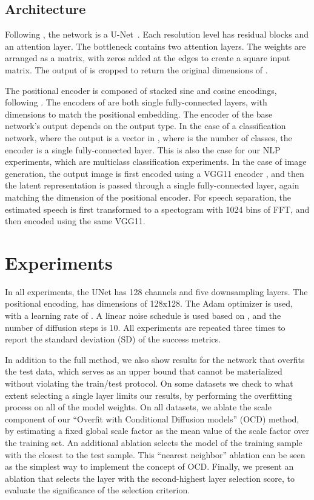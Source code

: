 \documentclass{article}
\theoremstyle{plain}
\begin{document}
\subsection{Architecture}
\label{sec:architecture}
Following  \citet{ho2020denoising}, the network  is a U-Net~\citep{unet}. Each resolution level has residual blocks and an attention layer. The bottleneck contains two attention layers. 
The weights  are arranged as a matrix, with zeros added at the edges to create a square input matrix. The output of  is cropped to return the original dimensions of .

The positional encoder is composed of stacked sine and cosine encodings, following \citet{attention_is_all_u_need}. The encoders of  are both single fully-connected layers, with dimensions to match the positional embedding.  The encoder of the base network's output  depends on the output type. In the case of a classification network, where the output is a vector in , where  is the number of classes, the encoder  is a single fully-connected layer. This is also the case for our NLP experiments, which are multiclass classification experiments. In the case of image generation, the output image is first encoded using a VGG11 encoder \citep{vgg}, and then the latent representation is passed through a single fully-connected layer, again matching the dimension of the positional encoder. For speech separation, the estimated speech is first transformed to a spectogram with 1024 bins of FFT, and then encoded using the same VGG11.

\section{Experiments}

 In all experiments, the UNet  has 128 channels and five downsampling layers. The positional encoding,  has dimensions of 128x128. The Adam optimizer \citep{kingma2014adam} is used, with a learning rate of . A linear noise schedule is used based on \citet{ddim}, and the number of diffusion steps is 10. All experiments are repeated three times to report the standard deviation (SD) of the success metrics. 
 
In addition to the full method, we also show results for the network that overfits the test data, which serves as an upper bound that cannot be materialized without violating the train/test protocol. On some datasets we check to what extent selecting a single layer limits our results, by performing the overfitting process on all of the model weights. On all datasets, we ablate the scale component of our ``Overfit with Conditional Diffusion models'' (OCD) method, by estimating a fixed global scale factor  as the mean value of the scale factor  over the training set. An additional ablation selects the model  of the training sample  with the closest  to the test sample. This ``nearest neighbor'' ablation can be seen as the simplest way to implement the concept of OCD. Finally, we present an ablation that selects the layer with the second-highest layer selection score, to evaluate the significance of the selection criterion.
\end{document}
